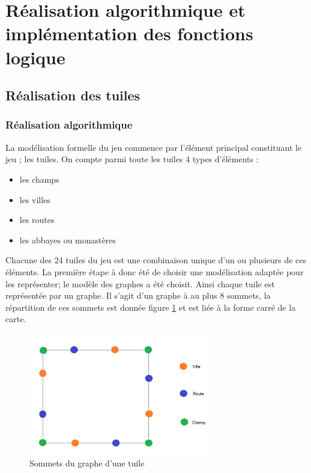 \documentclass[a4paper, 11pt]{article}
\begin{document}
\newpage

\section{Réalisation algorithmique et implémentation des fonctions logique}
 
     \subsection{Réalisation des tuiles}\label{sec:tuiles}
		\subsubsection{Réalisation algorithmique}\label{sec:tuiles-algo}
			\indent La modélisation formelle du jeu commence par l'élément principal constituant le jeu ; les tuiles. On compte parmi toute les tuiles 4 types d'éléments : 
			\begin{itemize}
				\item les champs
				\item les villes
				\item les routes
				\item les abbayes ou monastères
			\end{itemize} 
			Chacune des 24 tuiles du jeu est une combinaison unique d'un ou plusieurs de ces éléments. La première étape à donc été de choisir une modélisation adaptée pour les représenter; le modèle des graphes a été choisit. Ainsi chaque tuile est représentée par un graphe. Il s'agit d'un graphe à au plus 8 sommets, la répartition de ces sommets est donnée figure \ref{fig:sommet_disposition} et est liée à la forme carré de la carte. 
            
            \begin{figure}[H]
              \centering
    		  \includegraphics[width=0.7\textwidth]{img/Graphe_Tuile.jpg}
			  \caption{Sommets du graphe d'une tuile}
			  \label{fig:sommet_disposition}
			\end{figure}
            
\end{document}
